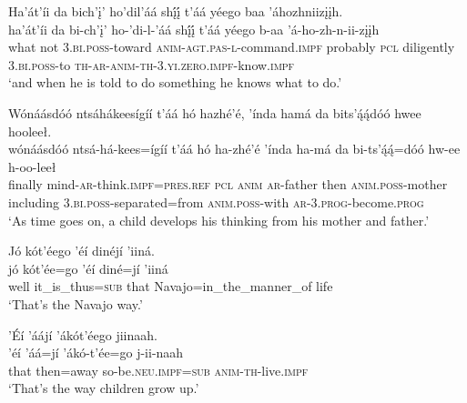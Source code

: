 \ea\label{ex:text6-16-25}
Ha’át’íi da bich’į’ ho’dil’áá shį́į́ t’áá yéego baa ’áhozhniizįįh.\\
\gll ha’át’íi	da	bi-ch’į’	ho-’di-l-’áá	shį́į́	t’áá	yéego	b-aa	’á-ho-zh-n-ii-zįįh\\
     what	not	3.\textsc{bi}.\textsc{poss}-toward	\textsc{anim}-\textsc{agt}.\textsc{pas}-\textsc{l}-command.\textsc{impf}	probably	\textsc{pcl}	diligently	3.\textsc{bi}.\textsc{poss}-to	\textsc{th}-\textsc{ar}-\textsc{anim}-\textsc{th}-3.\textsc{yi}.\textsc{zero}.\textsc{impf}-know.\textsc{impf}\\
\glt `and when he is told to do something he knows what to do.'
\z

\ea\label{ex:text6-16-26}
Wónáásdóó ntsáhákeesígíí t’áá hó hazhé’é, ’índa hamá da bits’ą́ą́dóó hwee hooleeł.\\
\gll wónáásdóó	ntsá-há-kees=ígíí	t’áá	hó	ha-zhé’é	’índa	ha-má	da	bi-ts’ą́ą́=dóó	hw-ee	h-oo-leeł\\
     finally	mind-\textsc{ar}-think.\textsc{impf}=\textsc{pres}.\textsc{ref}	\textsc{pcl}	\textsc{anim}	\textsc{ar}-father	then	\textsc{anim}.\textsc{poss}-mother	including	3.\textsc{bi}.\textsc{poss}-separated=from	\textsc{anim}.\textsc{poss}-with	\textsc{ar}-3.\textsc{prog}-become.\textsc{prog}\\
\glt `As time goes on, a child develops his thinking from his mother and father.'
\z

\ea\label{ex:text6-16-27}
Jó kót’éego ’éí dinéjí ’iiná.\\
\gll jó	kót’ée=go	’éí	diné=jí	’iiná\\
     well	it\_is\_thus=\textsc{sub}	that	Navajo=in\_the\_manner\_of	life\\
\glt `That's the Navajo way.'
\z

\ea\label{ex:text6-16-28}
’Éí ’áájí ’ákót’éego jiinaah.\\
\gll ’éí	’áá=jí	’ákó-t’ée=go	j-ii-naah\\
     that	then=away	so-be.\textsc{neu}.\textsc{impf}=\textsc{sub}	\textsc{anim}-\textsc{th}-live.\textsc{impf}\\
\glt `That's the way children grow up.'
\z

